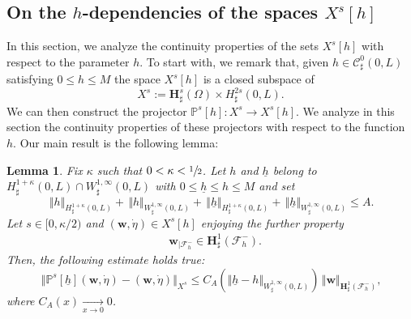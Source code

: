 \documentclass[JEP,XML,SOM,Unicode,NoFloatCountersInSection]{cedram}
\let\mathcal\mathscr
\newtheorem{lemma}[theorem]{Lemma}
\theoremstyle{remark}
\theoremstyle{definition}
\newcommand{\norme}[1]{\,\Vert #1\Vert}
\newcommand{\vnorme}[1]{\Vert #1\Vert}
\newcommand{\wg}{\boldsymbol{w}}
\newcommand{\BS}[1]{\boldsymbol{#1}}
\newcommand{\etap}{\dot{\eta}}
\newcommand{\hb}{{\underline{h}}}
\begin{document}
\subsection{On the $h$-dependencies of the spaces $X^s[h]$}
\label{continuite_h}
In this section, we analyze the continuity properties of the sets $X^s[h]$ with respect to the parameter $h$.
To start with, we remark that, given $h \in \mathcal{C}^0_{\sharp}(0,L)$ satisfying $0 \leq h \leq M$ the space
$X^s[h]$ is a closed subspace of
\[
X^s := \BS{H}^s_{\sharp}(\Omega) \times H^{2s}_{\sharp}(0,L).
\]
We can then construct the projector $\mathbb P^s[h] : X^s \to X^s[h]$. We analyze in this section the continuity
properties of these projectors with respect to the function $h$. Our main result is the following lemma:

\begin{lemma} \label{lem:projector}
Fix $\kappa$ such that $0<\kappa<\sfrac{1}{2}$. Let $h$ and $\hb$ belong to $H_\sharp^{1+\kappa}(0,L)\cap W_\sharp^{1,\infty}(0,L)$ with $0\leq \hb\leq h\leq M$ and set
\begin{equation}
\label{borne:A}\norme{h}_{H^{1+\kappa}_{\sharp}(0,L)}+\norme{h}_{W^{1,\infty}_{\sharp}(0,L)}+\norme{\hb}_{H^{1+\kappa}_{\sharp}(0,L)}+\norme{\hb}_{W^{1,\infty}_{\sharp}(0,L)}\leq A.
\end{equation}
Let $s \in [0,\kappa/2)$ and $(\wg,\etap) \in X^s[h]$ enjoying the further property
\begin{eqnarray}
&\wg_{\vert\mathcal{F}_{h}^{-}}\in \BS{H}^{1}_{\sharp}(\mathcal{F}^{-}_{h}).\label{hyp-Ps2}
\end{eqnarray}
Then, the following estimate holds true:
\begin{equation}\label{est.projector.main}
\norme{\mathbb{P}^{s}[\hb](\wg,\etap) -(\wg,\etap)}_{X^s}\leq C_{A}(\vnorme{\hb -h }_{W^{1,\infty}_{\sharp}(0,L)})\norme{\wg}_{\BS{H}^{1}_{\sharp}(\mathcal{F}^{-}_{h})},
\end{equation}
where $C_{A}(x)\underset{x\to 0}{\to}0$.
\end{lemma}
\end{document}
